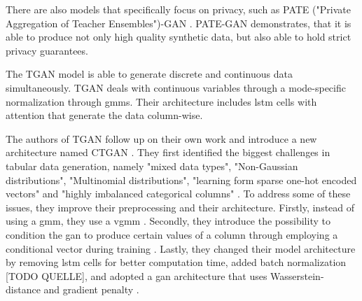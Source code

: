 There are also models that specifically focus on privacy, such as PATE ("Private Aggregation of Teacher Ensembles")-GAN  \cite{jordon2018PATEGANGeneratingSynthetic}.
PATE-GAN demonstrates, that it is able to produce not only high quality synthetic data, but also able to hold strict privacy guarantees.

The TGAN \cite{xu2018SynthesizingTabularData} model is able to generate discrete and continuous data simultaneously.
TGAN deals with continuous variables through a mode-specific normalization through \glspl{gmm}\cite[p. 3]{xu2018SynthesizingTabularData}.
Their architecture includes \gls{lstm} cells with attention that generate the data column-wise\cite{xu2018SynthesizingTabularData}.

The authors of TGAN follow up on their own work and introduce a new architecture named CTGAN \cite{xu2019ModelingTabularData}.
They first identified the biggest challenges in tabular data generation, namely "mixed data types", "Non-Gaussian distributions", "Multinomial distributions", "learning form sparse one-hot encoded vectors" and "highly imbalanced categorical columns" \cite[p. 3]{xu2019ModelingTabularData}.
To address some of these issues, they improve their preprocessing and their architecture.
Firstly, instead of using a \gls{gmm}, they use a \gls{vgmm} \cite{xu2019ModelingTabularData}.
Secondly, they introduce the possibility to condition the \gls{gan} to produce certain values of a column through employing a conditional vector during training \cite{xu2019ModelingTabularData}.
Lastly, they changed their model architecture by removing \gls{lstm} cells for better computation time, added batch normalization [TODO QUELLE], 
and adopted a \gls{gan} architecture that uses Wasserstein-distance and gradient penalty \cite{gulrajani2017ImprovedTrainingWasserstein}.

